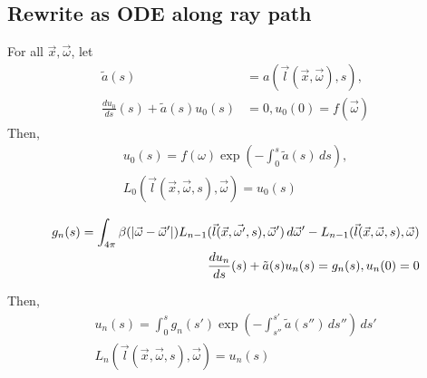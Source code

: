 
\subsection{Rewrite as ODE along ray path}
For all $\vec{x}, \vec{\omega}$, let
\begin{align}
  \tilde{a}(s) &= a(\vec{l}(\vec{x}, \vec{\omega}), s), \\ 
  \frac{du_0}{ds}(s) + \tilde{a}(s) u_0(s) &= 0, u_0(0) = f(\vec{\omega})
\end{align}
Then,
\begin{align}
  u_0(s) = f(\omega) \exp\left(-\int_0^s \tilde{a}(s)\, ds\right), \\
  L_0(\vec{l}(\vec{x}, \vec{\omega},s), \vec{\omega}) = u_0(s)
\end{align}

\begin{align}
  g_n(s) = \int_{4\pi} \beta(\left| \vec{\omega} - \vec{\omega}' \right|)
  L_{n-1}(\vec{l}(\vec{x}, \vec{\omega'}, s), \vec{\omega}')\,d\vec{\omega}' - L_{n-1}(\vec{l}(\vec{x}, \vec{\omega}, s), \vec{\omega}) \\ 
  \frac{du_n}{ds}(s) + \tilde{a}(s)u_n(s) = g_n(s), u_n(0) = 0
\end{align}

Then,
\begin{align}
  u_n(s) = \int_0^sg_n(s')\exp\left( -\int_{s''}^{s'}\tilde{a}(s'')\,ds'' \right)\, ds' \\
  L_n(\vec{l}(\vec{x}, \vec{\omega}, s), \vec{\omega}) = u_n(s)
\end{align}
